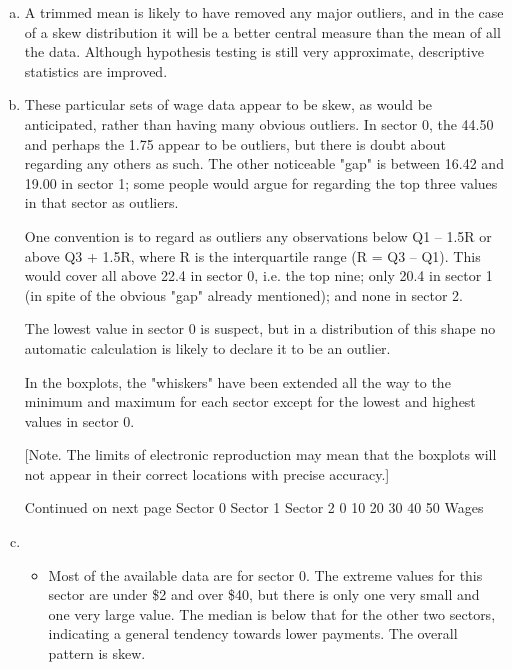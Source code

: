 \documentclass[a4paper,12pt]{article}
\begin{document}
\begin{enumerate}[(a)] 
\item A trimmed mean is likely to have removed any major outliers, and in the case of a skew distribution it will be a better central measure than the mean of all the data.  Although hypothesis testing is still very approximate, descriptive statistics are improved. 
 
 
\item These particular sets of wage data appear to be skew, as would be anticipated, rather than having many obvious outliers.  In sector 0, the 44.50 and perhaps the 1.75 appear to be outliers, but there is doubt about regarding any others as such.  The other noticeable "gap" is between 16.42 and 19.00 in sector 1;  some people would argue for regarding the top three values in that sector as outliers. 
 
One convention is to regard as outliers any observations below Q1 – 1.5R or above Q3 + 1.5R, where R is the interquartile range (R = Q3 – Q1).  This would cover all above 22.4 in sector 0, i.e. the top nine;  only 20.4 in sector 1 (in spite of the obvious "gap" already mentioned);  and none in sector 2. 
 
The lowest value in sector 0 is suspect, but in a distribution of this shape no automatic calculation is likely to declare it to be an outlier. 
 
In the boxplots, the "whiskers" have been extended all the way to the minimum and maximum for each sector except for the lowest and highest values in sector 0. 
 
 
 
 
 
 
 
 
 
 
[Note.  The limits of electronic reproduction may mean that the boxplots will not appear in their correct locations with precise accuracy.] 
 
 
 
Continued on next page 
Sector 0
Sector 1
Sector 2
0 10 20 30 40 50 Wages 

\newpage 
\item  


\begin{itemize}
    \item Most of the available data are for sector 0.  The extreme values for this sector are under \$2 and over \$40, but there is only one very small and one very large value.  The median is below that for the other two sectors, indicating a general tendency towards lower payments.  The overall pattern is skew. 
 

\end{itemize}
\end{enumerate}
\end{document}
